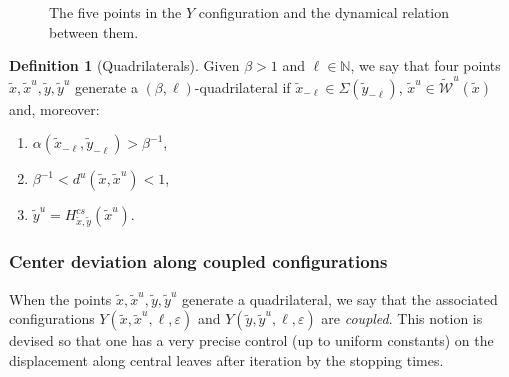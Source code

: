 \documentclass[a4paper,11pt,reqno]{amsart}
\newcommand{\N}{{\mathbb N}}
\newcommand{\cW}{{\mathcal W}}
\newcommand{\eps}{\varepsilon}
\newcommand{\tix}{\tilde{x}}
\newcommand{\w}{\widetilde{\cW}}
\theoremstyle{definition}
\newtheorem{definition}[theorem]{Definition}
\begin{document}
\begin{figure}[ht]
    \caption{\label{fig:yconfig} The five points in the $Y$ configuration and the dynamical relation between them.}
\end{figure}

\begin{definition}[Quadrilaterals]
 Given $\beta>1$ and $\ell\in\N$, we say that four points $\tix,\tix^u,\tilde{y},\tilde{y}^u$ generate a $(\beta,\ell)$-quadrilateral if $\tix_{-\ell}\in\Sigma(\tilde{y}_{-\ell})$, $\tix^u\in\w^u(\tix)$ and, moreover:
\begin{enumerate}
    \item $\alpha(\tix_{-\ell},\tilde{y}_{-\ell})>\beta^{-1}$,
    \item $\beta^{-1}<d^u(\tix,\tix^u)<1$,
    \item $\tilde{y}^u=H^{cs}_{\tix,\tilde{y}}(\tix^u)$.
\end{enumerate}
\end{definition}

\subsubsection{Center deviation along coupled configurations}

When the points $\tix,\tix^u,\tilde{y},\tilde{y}^u$ generate a quadrilateral, we say that the associated configurations $Y(\tix,\tix^u,\ell,\eps)$ and $Y(\tilde{y},\tilde{y}^u,\ell,\eps)$ are \emph{coupled}. This notion is devised so that one has a very precise control (up to uniform constants) on the displacement along central leaves after iteration by the stopping times. 
\end{document}
